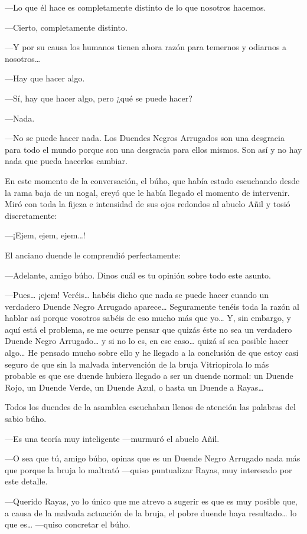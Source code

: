 \documentclass{barcodevapor3pags}
\begin{document}
---Lo que él hace es completamente distinto de lo que nosotros hacemos.

---Cierto, completamente distinto.

---Y por su causa los humanos tienen ahora razón para temernos y
odiarnos a nosotros\ldots{}

---Hay que hacer algo.

---Sí, hay que hacer algo, pero ¿qué se puede hacer?

---Nada.

---No se puede hacer nada. Los Duendes Negros Arrugados son una
desgracia para todo el mundo porque son una desgracia para ellos mismos.
Son así y no hay nada que pueda hacerlos cambiar.

En este momento de la conversación, el búho, que había estado escuchando
desde la rama baja de un nogal, creyó que le había llegado el momento de
intervenir. Miró con toda la fijeza e intensidad de sus ojos redondos al
abuelo Añil y tosió discretamente:

---¡Ejem, ejem, ejem\ldots!

El anciano duende le comprendió perfectamente:

---Adelante, amigo búho. Dinos cuál es tu opinión sobre todo este
asunto.

---Pues\ldots{} ¡ejem! Veréis\ldots{} habéis dicho que nada se puede
hacer cuando un verdadero Duende Negro Arrugado aparece\ldots{}
Seguramente tenéis toda la razón al hablar así porque vosotros sabéis de
eso mucho más que yo\ldots{} Y, sin embargo, y aquí está el problema, se
me ocurre pensar que quizás éste no sea un verdadero Duende Negro
Arrugado\ldots{} y si no lo es, en ese caso\ldots{} quizá sí sea posible
hacer algo\ldots{} He pensado mucho sobre ello y he llegado a la
conclusión de que estoy casi seguro de que sin la malvada intervención
de la bruja Vitriopirola lo más probable es que ese duende hubiera
llegado a ser un duende normal: un Duende Rojo, un Duende Verde, un
Duende Azul, o hasta un Duende a Rayas\ldots{}

Todos los duendes de la asamblea escuchaban llenos de atención las
palabras del sabio búho.

---Es una teoría muy inteligente ---murmuró el abuelo Añil.

---O sea que tú, amigo búho, opinas que es un Duende Negro Arrugado nada
más que porque la bruja lo maltrató ---quiso puntualizar Rayas, muy
interesado por este detalle.

---Querido Rayas, yo lo único que me atrevo a sugerir es que es muy
posible que, a causa de la malvada actuación de la bruja, el pobre
duende haya resultado\ldots{} lo que es\ldots{} ---quiso concretar el
búho.
\end{document}
